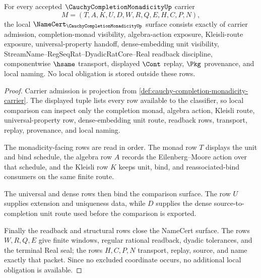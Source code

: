 \begin{theorem}
\label{thm:cauchy-completion-monadicity-obligations}
For every accepted $\CauchyCompletionMonadicityUp$ carrier
$$
M=(T,A,K,U,D,W,R,Q,E,H,C,P,N),
$$
the local $\NameCert_{\CauchyCompletionMonadicityUp}$ surface consists exactly of carrier admission, completion-monad visibility, algebra-action exposure, Kleisli-route exposure, universal-property handoff, dense-embedding unit visibility, StreamName--RegSeqRat--DyadicRatCore--Real readback discipline, componentwise $\hsame$ transport, displayed $\Cont$ replay, $\Pkg$ provenance, and local naming. No local obligation is stored outside these rows.
\end{theorem}
\begin{proof}
Carrier admission is projection from \autoref{def:cauchy-completion-monadicity-carrier}. The displayed tuple lists every row available to the classifier, so local comparison can inspect only the completion monad, algebra action, Kleisli route, universal-property row, dense-embedding unit route, readback rows, transport, replay, provenance, and local naming.

The monadicity-facing rows are read in order. The monad row $T$ displays the unit and bind schedule, the algebra row $A$ records the Eilenberg--Moore action over that schedule, and the Kleisli row $K$ keeps unit, bind, and reassociated-bind consumers on the same finite route.

The universal and dense rows then bind the comparison surface. The row $U$ supplies extension and uniqueness data, while $D$ supplies the dense source-to-completion unit route used before the comparison is exported.

Finally the readback and structural rows close the NameCert surface. The rows $W,R,Q,E$ give finite windows, regular rational readback, dyadic tolerances, and the terminal Real seal; the rows $H,C,P,N$ transport, replay, source, and name exactly that packet. Since no excluded coordinate occurs, no additional local obligation is available.
\end{proof}

